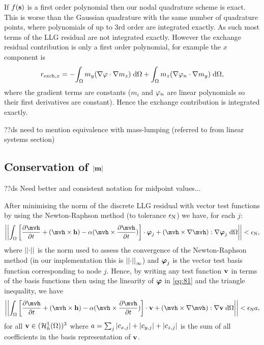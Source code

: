 If $f({\boldsymbol{\mathrm{s}}})$ is a first order polynomial then our nodal quadrature scheme is exact.
This is worse than the Gaussian quadrature with the same number of quadrature points, where polynomials of up to 3rd order are integrated exactly.
As such most terms of the LLG residual are not integrated exactly.
However the exchange residual contribution is only a first order polynomial, for example the $x$ component is
\begin{equation}
  \begin{aligned}
    r_{\text{exch},x} = - {\int_{\Omega} { m_y {\left( \nabla \varphi \cdot \nabla m_z \right)}} {\; \mathrm{{d}}} {\Omega}} + {\int_{\Omega} { m_z {\left( \nabla \varphi_n \cdot \nabla m_y \right)}} {\; \mathrm{{d}}} {\Omega}},
  \end{aligned}
\end{equation}
where the gradient terms are constants ($m_i$ and $\varphi_n$ are linear polynomials so their first derivatives are constant).
Hence the exchange contribution is integrated exactly.


??ds need to mention equivalence with mass-lumping (referred to from linear systems section)

\subsection{Conservation of $\left|{\boldsymbol{\mathrm{m}}} \right|$}
\label{sec:weak-cons-absmv}

??ds Need better and consistent notation for midpoint values...

After minimising the norm of the discrete LLG residual with vector test functions by using the Newton-Raphson method (to tolerance $\epsilon_{\mathrm{N}}$) we have, for each $j$:
\begin{equation}
  \norm{\intd{ \bigs{\dmdth  + (\mvh \times \hv) - \dampc (\mvh \times \dmdth)} \cdot \tbfv_j + \bigb{\mvh \times \grad \mvh} : \grad \tbfv_j}} < \ntol,
  \label{eq:81}
\end{equation}
where $\left| \left| \cdot \right| \right|$ is the norm used to assess the convergence of the Newton-Raphson method (in our implementation this is $\left| \left| \cdot \right| \right|_\infty$) and $\boldsymbol{\mathrm{\varphi}}_j$ is the vector test basis function corresponding to node $j$.
Hence, by writing any test function $\boldsymbol{\mathrm{v}}$ in terms of the basis functions then using the linearity of $\boldsymbol{\mathrm{\varphi}}$ in \cref{eq:81} and the triangle inequality, we have
\begin{equation}
  \norm{\intd{ \bigs{\dmdth  + (\mvh \times \hv) - \dampc (\mvh \times \dmdth)} \cdot \testv + \bigb{\mvh \times \grad \mvh} : \grad \testv}} < \ntol  \sumbasiscoeff,
  \label{eq:82}
\end{equation}
for all $\boldsymbol{\mathrm{v}} \in ({\mathcal{H}^1_h(\Omega)})^3$ where $a = \sum_j  \left|{c_{x,j}} \right| + \left|{c_{y,j}} \right| + \left|{c_{z,j}} \right|$ is the sum of all coefficients in the basis representation of $\boldsymbol{\mathrm{v}}$.

